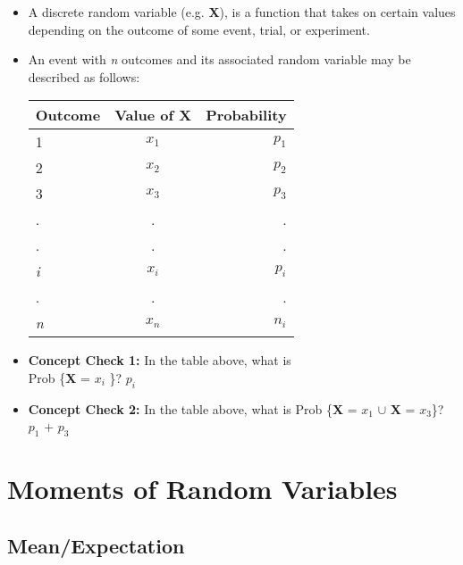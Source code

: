 \documentclass[12pt]{report}
\begin{document}
\begin{itemize}

\item A discrete random variable (e.g. \textbf{X}), is a function that takes on certain values depending on the outcome of some event, trial, or experiment.

\item An event with \textit{n} outcomes and its associated random variable may be described as follows:

\begin{tabular}{| l | c | r |}
	\hline
 Outcome & Value of \textbf{X} & Probability \\ \hline
  1 & \textit{$x_{1}$} & \textit{$p_{1}$} \\
  2 & \textit{$x_{2}$}  & \textit{$p_{2}$} \\
  3 & \textit{$x_{3}$} & \textit{$p_{3}$} \\
  . & . & . \\
  . & . & . \\
  \textit{i} & \textit{$x_{i}$}  & \textit{$p_{i}$} \\
  . & .  & . \\
  \textit{n} & \textit{$x_{n}$}  & \textit{$n_{i}$} \\ \hline
\end{tabular}

\bigskip

\item \textbf{Concept Check 1:} In the table above, what is \\ Prob \{{\textbf{X} = \textit{$x_{i}$} }\}? \color{red} \textit{$p_{i}$} 

\color{black}
\item \textbf{Concept Check 2:} In the table above, what is Prob \{{\textbf{X} = \textit{$x_{1}$} $\cup$ \textbf{X} = \textit{$x_{3}$}}\}? \color{red} \textit{$p_{1}$} + \textit{$p_{3}$}  

\end{itemize}

\section{Moments of Random Variables}

\subsection{Mean/Expectation}
\end{document}
